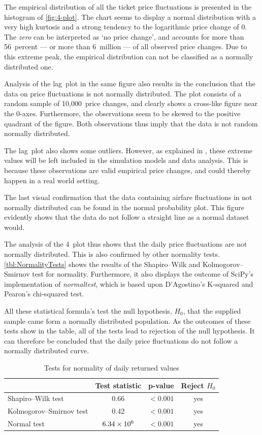 The empirical distribution of all the ticket price fluctuations is presented in the histogram of \autoref{fig:4-plot}. The chart seems to display a normal distribution with a very high kurtosis and a strong tendency to the logarithmic price change of 0. The \emph{zero} can be interpreted as `no price change', and accounts for more than 56~percent --- or more than 6~million --- of all observed price changes. Due to this extreme peak, the empirical distribution can not be classified as a normally distributed one.

Analysis of the lag~plot in the same figure also results in the conclusion that the data on price fluctuations is not normally distributed. The plot consists of a random sample of 10,000~price changes, and clearly shows a cross-like figure near the 0-axes. Furthermore, the observations seem to be skewed to the positive quadrant of the figure. Both observations thus imply that the data is not random normally distributed.

The lag~plot also shows some outliers. However, as explained in , these extreme values will be left included in the simulation models and data analysis. This is because these observations are valid empirical price changes, and could thereby happen in a real world setting.

The last visual confirmation that the data containing airfare fluctuations in not normally distributed can be found in the normal probability plot. This figure evidently shows that the data do not follow a straight line as a normal dataset would. 

The analysis of the 4~plot thus shows that the daily price fluctuations are not normally distributed. This is also confirmed by other normality tests. \autoref{tbl:NormalityTests} shows the results of the Shapiro--Wilk and Kolmogorov--Smirnov test for normality. Furthermore, it also displays the outcome of SciPy's implementation of \emph{normaltest}, which is based upon D'Agostino's K-squared and Pearon's chi-squared test.

All these statistical formula's test the null hypothesis, $H_0$, that the supplied sample came form a normally distributed population. As the outcomes of these tests show in the table, all of the tests lead to rejection of the null hypothesis. It can therefore be concluded that the daily price fluctuations do not follow a normally distributed curve.


\begin{table}
\centering
\begin{tabular}{l c c c}
\toprule
~  &  Test statistic  &  p-value  &  Reject $H_0$  \\
\midrule
Shapiro--Wilk test  &  0.66  &  $< 0.001$  & yes \\
Kolmogorov--Smirnov test  & 0.42  &  $< 0.001$  & yes \\
Normal test  & $6.34 \times 10^{6}$  & $< 0.001$  & yes \\
\bottomrule
\end{tabular}
\caption{Tests for normality of daily returned values}
\label{tbl:NormalitTests}
\end{table}


